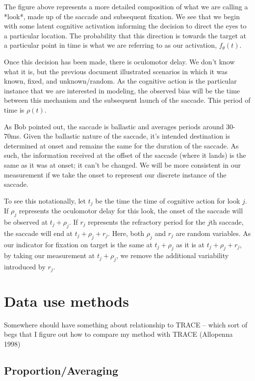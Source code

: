 \documentclass{article}
\begin{document}
The figure above represents a more detailed composition of what we are calling a *look*, made up of the saccade and subsequent fixation. We see that we begin with some latent cognitive activation informing the decision to direct the eyes to a particular location. The probability that this direction is towards the target at a particular point in time is what we are referring to as our activation, $f_{\theta}(t)$.

Once this decision has been made, there is oculomotor delay. We don't know what it is, but the previous document illustrated scenarios in which it was known, fixed, and unknown/random. As the cognitive action is the particular instance that we are interested in modeling, the observed bias will be the time between this mechanism and the subsequent launch of the saccade. This period of time is $\rho(t)$.

As Bob pointed out, the saccade is ballastic and averages periods around 30-70ms. Given the ballastic nature of the saccade, it's intended destination is determined at onset and remains the same for the duration of the saccade. As such, the information received at the offset of the saccade (where it lands) is the same as it was at onset; it can't be changed. We will be more consistent in our measurement if we take the onset to represent our discrete instance of the saccade. 

To see this notationally, let $t_j$ be the time the time of cognitive action for look $j$. If $\rho_j$ represents the oculomotor delay for this look, the onset of the saccade will be observed at $t_j + \rho_j$. If $r_j$ represents the refractory period for the  $j$th saccade, the saccade will end at $t_j + \rho_j + r_j$. Here, both $\rho_j$ and $r_j$ are random variables. As our indicator for fixation on target is the same at $t_j + \rho_j$ as it is at $t_j + \rho_j + r_j$, by taking our measurement at $t_j + \rho_j$, we remove the additional variability introduced by $r_j$. 

\section{Data use methods}

Somewhere should have something about relationship to TRACE -- which sort of begs that I figure out how to compare my method with TRACE (Allopenna 1998)

\subsection{Proportion/Averaging}
\end{document}
